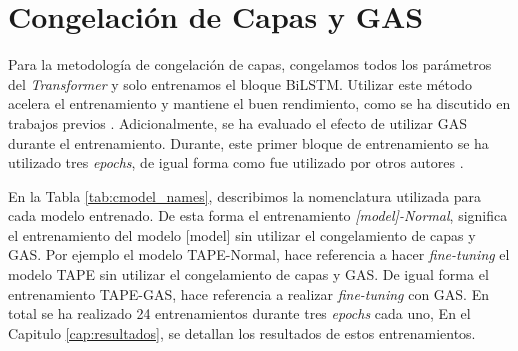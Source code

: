 \section{Congelación de Capas y GAS}

Para la metodología de congelación de capas, congelamos todos los parámetros del \textit{Transformer} y solo entrenamos el bloque BiLSTM. Utilizar este método acelera el entrenamiento y mantiene el buen rendimiento, como se ha discutido en trabajos previos \citep{merchant2020happens,lee2019would,kovaleva2019revealing}. Adicionalmente, se ha evaluado el efecto de utilizar GAS durante el entrenamiento. Durante, este primer bloque de entrenamiento se ha utilizado tres \textit{epochs}, de igual forma como fue utilizado por otros autores \citep{zhang2022hlab}. 

En la Tabla \ref{tab:cmodel_names}, describimos la nomenclatura utilizada para cada modelo entrenado. De esta forma el entrenamiento \textit{[model]-Normal}, significa el entrenamiento del modelo [model] sin utilizar el congelamiento de capas y GAS. Por ejemplo el modelo TAPE-Normal, hace referencia a hacer \textit{fine-tuning} el modelo TAPE sin utilizar el congelamiento de capas y GAS. De igual forma el entrenamiento TAPE-GAS, hace referencia a realizar \textit{fine-tuning} con GAS. En total se ha realizado 24 entrenamientos durante tres \textit{epochs} cada uno, En el Capitulo \ref{cap:resultados}, se detallan los resultados de estos entrenamientos.

